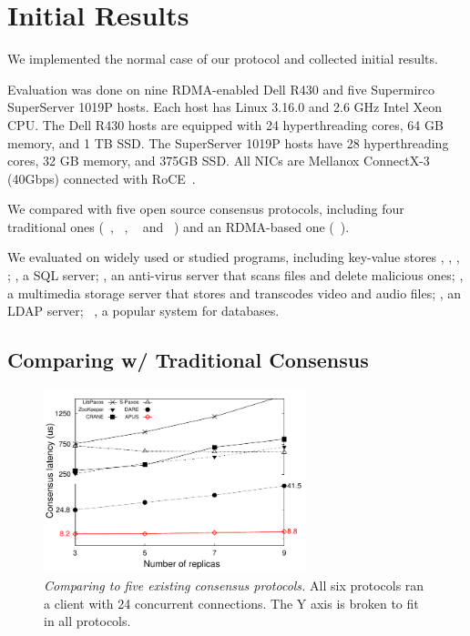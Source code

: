 \section{Initial Results} \label{sec:evaluation}
We implemented the normal case of our protocol and collected initial 
results.

Evaluation was done on nine RDMA-enabled Dell R430 and five Supermirco 
SuperServer 1019P hosts. Each host has Linux 3.16.0 and 2.6 GHz Intel Xeon 
CPU. The Dell R430 hosts are equipped with 24 hyperthreading cores, 64 GB 
memory, and 1 TB SSD. The SuperServer 1019P hosts have 28 hyperthreading 
cores, 32 GB memory, and 375GB SSD. All NICs are Mellanox ConnectX-3 (40Gbps) 
connected with RoCE~\cite{roce}.

We compared \xxx with five open source consensus protocols, including four 
traditional ones (\libpaxos~\cite{libpaxos}, \zookeeper~\cite{zookeeper}, 
\crane~\cite{crane:sosp15} and \spaxos~\cite{spaxos:srds12}) and an RDMA-based 
one (\dare~\cite{dare:hpdc15}).

We evaluated \xxx on \nprog widely used or studied programs, including
\nkvprog key-value stores \redis, \memcached, \ssdb, \mongodb; \mysql, a SQL
server; \clamav, an anti-virus server that scans files and delete malicious 
ones; \mediatomb, a multimedia storage server that stores and transcodes video 
and audio files; \openldap, an LDAP server; \calvin~\cite{calvin:sigmod12}, a 
popular \smr system for databases.

\subsection{Comparing w/ Traditional Consensus}
\label{sec:eval-traditional}

\begin{figure}[t]
\begin{center}
\includegraphics[width=3in]{figures/traditional_paxos_latency}
\caption{{\em Comparing \xxx to five existing consensus protocols.} All 
six protocols ran a client with 24 concurrent connections. The Y axis is 
broken to fit in all protocols.}
\label{fig:scalability}
\end{center}
\end{figure}

